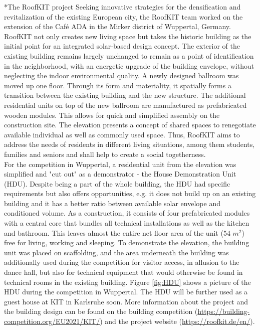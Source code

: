 \documentclass[twocolumn, a4paper,10pt]{article}
\makeatletter
\renewcommand\section{\@startsection{section}{1}{\z@}{3pt}{3pt}{\normalfont\large\bfseries}}
\makeatother
\begin{document}
\section*{The RoofKIT project}
Seeking innovative strategies for the densification and revitalization of the existing European city, the RoofKIT team worked on the extension of the Café ADA in the Mirker district of Wuppertal, Germany. RoofKIT not only creates new living space but takes the historic building as the initial point for an integrated solar-based design concept. The exterior of the existing building remains largely unchanged to remain as a point of identification in the neighborhood, with an energetic upgrade of the building envelope, without neglecting the indoor environmental quality. A newly designed ballroom was moved up one floor. Through its form and materiality, it spatially forms a transition between the existing building and the new structure. The additional residential units on top of the new ballroom are manufactured as prefabricated wooden modules. This allows for quick and simplified assembly on the construction site. The elevation presents a concept of shared spaces to renegotiate available individual as well as commonly used space. Thus, RoofKIT aims to address the needs of residents in different living situations, among them students, families and seniors and shall help to create a social togetherness.\\
For the competition in Wuppertal, a residential unit from the elevation was simplified and "cut out" as a demonstrator - the House Demonstration Unit (HDU). Despite being a part of the whole building, the HDU had specific requirements but also offers opportunities, e.g. it does not build up on an existing building and it has a better ratio between available solar envelope and conditioned volume. As a construction, it consists of four prefabricated modules with a central core that bundles all technical installations as well as the kitchen and bathroom. This leaves almost the entire net floor area of the unit (54 $m^2$) free for living, working and sleeping. To demonstrate the elevation, the building unit was placed on scaffolding, and the area underneath the building was additionally used during the competition for visitor access, in allusion to the dance hall, but also for technical equipment that would otherwise be found in technical rooms in the existing building. Figure \ref{fig:HDU} shows a picture of the HDU during the competition in Wuppertal. The HDU will be further used as a guest house at KIT in Karlsruhe soon. More information about the project and the building design can be found on the building competition (\textcolor{blue}{\url{https://building-competition.org/EU2021/KIT/}}) and the project website (\textcolor{blue}{\url{https://roofkit.de/en/}}).
\end{document}
